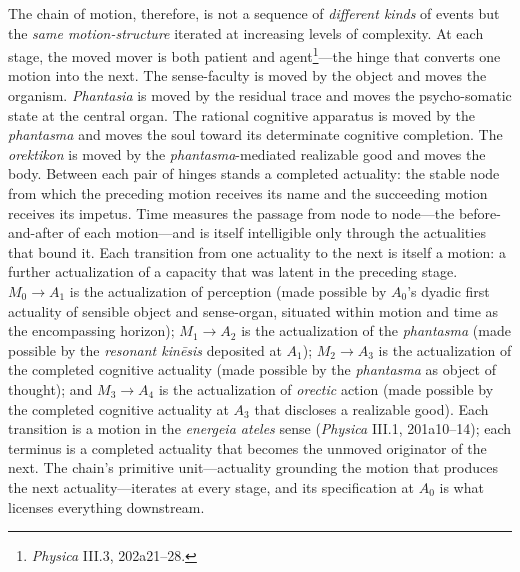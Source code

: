 \documentclass{article}
\begin{document}
The chain of motion, therefore, is not a sequence of \textit{different kinds} of events but the \textit{same motion-structure} iterated at increasing levels of complexity. At each stage, the moved mover is both patient and agent\footnote{\textit{Physica} III.3, 202a21--28.}---the hinge that converts one motion into the next. The sense-faculty is moved by the object and moves the organism. \textit{Phantasia} is moved by the residual trace and moves the psycho-somatic state at the central organ. The rational cognitive apparatus is moved by the \textit{phantasma} and moves the soul toward its determinate cognitive completion. The \textit{orektikon} is moved by the \textit{phantasma}-mediated realizable good and moves the body. Between each pair of hinges stands a completed actuality: the stable node from which the preceding motion receives its name and the succeeding motion receives its impetus. Time measures the passage from node to node---the before-and-after of each motion---and is itself intelligible only through the actualities that bound it. Each transition from one actuality to the next is itself a motion: a further actualization of a capacity that was latent in the preceding stage. $M_0 \rightarrow A_1$ is the actualization of perception (made possible by $A_0$'s dyadic first actuality of sensible object and sense-organ, situated within motion and time as the encompassing horizon); $M_1 \rightarrow A_2$ is the actualization of the \textit{phantasma} (made possible by the \textit{resonant kinēsis} deposited at $A_1$); $M_2 \rightarrow A_3$ is the actualization of the completed cognitive actuality (made possible by the \textit{phantasma} as object of thought); and $M_3 \rightarrow A_4$ is the actualization of \textit{orectic} action (made possible by the completed cognitive actuality at $A_3$ that discloses a realizable good). Each transition is a motion in the \textit{energeia ateles} sense (\textit{Physica} III.1, 201a10--14); each terminus is a completed actuality that becomes the unmoved originator of the next. The chain's primitive unit---actuality grounding the motion that produces the next actuality---iterates at every stage, and its specification at $A_0$ is what licenses everything downstream. 
\end{document}
